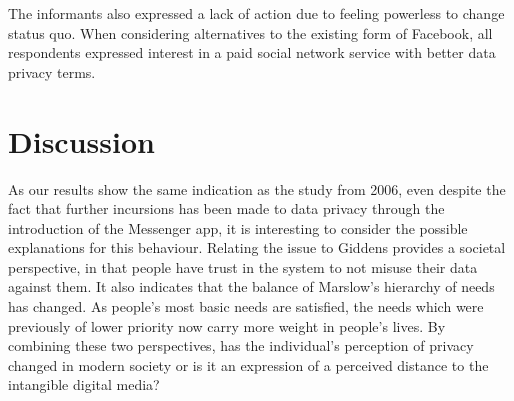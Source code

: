 The informants also expressed a lack of action due to feeling powerless to change status quo. When considering alternatives to the existing form of Facebook, all respondents expressed interest in a paid social network service with better data privacy terms.

\section{Discussion}
As our results show the same indication as the study from 2006, even despite the fact that further incursions has been made to data privacy through the introduction of the Messenger app, it is interesting to consider the possible explanations for this behaviour. Relating the issue to Giddens provides a societal perspective, in that people have trust in the system to not misuse their data against them. It also indicates that the balance of Marslow’s hierarchy of needs has changed. As people’s most basic needs are satisfied, the needs which were previously of lower priority now carry more weight in people’s lives. By combining these two perspectives, has the individual’s perception of privacy changed in modern society or is it an expression of a perceived distance to the intangible digital media?